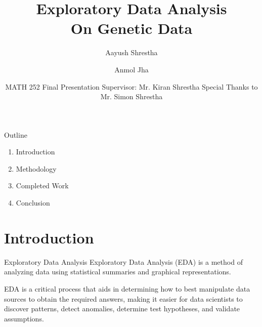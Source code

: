 \documentclass{beamer}
\title{Exploratory Data Analysis\\On Genetic Data}
\date{\small MATH 252 Final Presentation \newline Supervisor: Mr. Kiran Shrestha\newline
Special Thanks to Mr. Simon Shrestha}
\institute{Kathmandu University \\ Department of Computational Mathematics}
\author{Aayush Shrestha \and Anmol Jha}
\begin{document}
	
	\justifying
	\begin{frame}
		\titlepage
	\end{frame}
	\pagenumbering{}
	\begin{frame}{Outline}
		\begin{enumerate}
			\item Introduction
			\item Methodology
			\item Completed Work
			\item Conclusion
		\end{enumerate}
	\end{frame}
	
	\section{Introduction}
	\begin{frame}{Exploratory Data Analysis}
		Exploratory Data Analysis (EDA) is a method of analyzing data using statistical summaries and graphical representations.\newline \newline
		
		EDA is a critical process that aids in determining how to best manipulate data sources to obtain the required answers, making it easier for data scientists to discover patterns, detect anomalies, determine test hypotheses, and validate assumptions.
	\end{frame}
	
\end{document}
